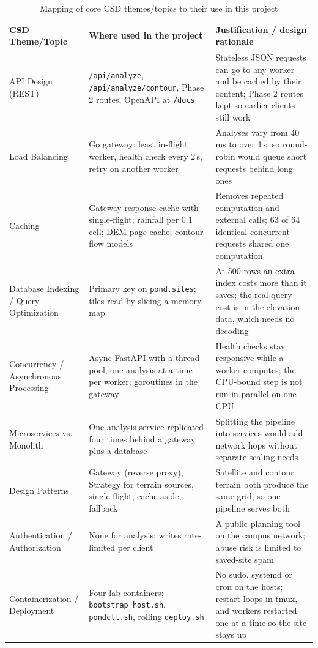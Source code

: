 \documentclass[manuscript,screen,review]{acmart}
\begin{document}
\begin{table}[t]
  \caption{Mapping of core CSD themes/topics to their use in this project}
  \label{tab:csd-themes}
  \footnotesize
  \begin{tabular}{L{2.6cm}L{5.0cm}L{6.3cm}}
    \toprule
    CSD Theme/Topic & Where used in the project & Justification / design rationale \\
    \midrule
    API Design (REST) & \texttt{/api/analyze}, \texttt{/api/analyze/contour}, Phase 2 routes, OpenAPI at \texttt{/docs} & Stateless JSON requests can go to any worker and be cached by their content; Phase 2 routes kept so earlier clients still work \\
    Load Balancing & Go gateway: least in-flight worker, health check every 2\,s, retry on another worker & Analyses vary from 40\,ms to over 1\,s, so round-robin would queue short requests behind long ones \\
    Caching & Gateway response cache with single-flight; rainfall per 0.1\textdegree{} cell; DEM page cache; contour flow models & Removes repeated computation and external calls; 63 of 64 identical concurrent requests shared one computation \\
    Database Indexing / Query Optimization & Primary key on \texttt{pond.sites}; tiles read by slicing a memory map & At 500 rows an extra index costs more than it saves; the real query cost is in the elevation data, which needs no decoding \\
    Concurrency / Asynchronous Processing & Async FastAPI with a thread pool, one analysis at a time per worker; goroutines in the gateway & Health checks stay responsive while a worker computes; the CPU-bound step is not run in parallel on one CPU \\
    Microservices vs. Monolith & One analysis service replicated four times behind a gateway, plus a database & Splitting the pipeline into services would add network hops without separate scaling needs \\
    Design Patterns & Gateway (reverse proxy), Strategy for terrain sources, single-flight, cache-aside, fallback & Satellite and contour terrain both produce the same grid, so one pipeline serves both \\
    Authentication / Authorization & None for analysis; writes rate-limited per client & A public planning tool on the campus network; abuse risk is limited to saved-site spam \\
    Containerization / Deployment & Four lab containers; \texttt{bootstrap\_host.sh}, \texttt{pondctl.sh}, rolling \texttt{deploy.sh} & No sudo, systemd or cron on the hosts; restart loops in tmux, and workers restarted one at a time so the site stays up \\

\end{tabular}
\end{table}
\end{document}
